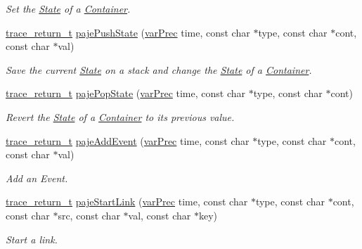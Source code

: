\begin{DoxyCompactItemize}
\begin{DoxyCompactList}\small\item\em Set the \hyperlink{structState}{State} of a \hyperlink{structContainer}{Container}. \end{DoxyCompactList}\item 
\hyperlink{group__type_ga1f1b68fb37d7331f03a48ef0993a0788}{trace\-\_\-return\-\_\-t} \hyperlink{group__cpaje_gaf92058cdf7d12c550866c98bf59338b8}{paje\-Push\-State} (\hyperlink{group__type_gabda13d5bcd0cbdb094d655181a857e25}{var\-Prec} time, const char $\ast$type, const char $\ast$cont, const char $\ast$val)
\begin{DoxyCompactList}\small\item\em Save the current \hyperlink{structState}{State} on a stack and change the \hyperlink{structState}{State} of a \hyperlink{structContainer}{Container}. \end{DoxyCompactList}\item 
\hyperlink{group__type_ga1f1b68fb37d7331f03a48ef0993a0788}{trace\-\_\-return\-\_\-t} \hyperlink{group__cpaje_ga67bd495e65937ecdc1bfe450cb0f0018}{paje\-Pop\-State} (\hyperlink{group__type_gabda13d5bcd0cbdb094d655181a857e25}{var\-Prec} time, const char $\ast$type, const char $\ast$cont)
\begin{DoxyCompactList}\small\item\em Revert the \hyperlink{structState}{State} of a \hyperlink{structContainer}{Container} to its previous value. \end{DoxyCompactList}\item 
\hyperlink{group__type_ga1f1b68fb37d7331f03a48ef0993a0788}{trace\-\_\-return\-\_\-t} \hyperlink{group__cpaje_ga303effbd4344a2f42872d4e70471250f}{paje\-Add\-Event} (\hyperlink{group__type_gabda13d5bcd0cbdb094d655181a857e25}{var\-Prec} time, const char $\ast$type, const char $\ast$cont, const char $\ast$val)
\begin{DoxyCompactList}\small\item\em Add an Event. \end{DoxyCompactList}\item 
\hyperlink{group__type_ga1f1b68fb37d7331f03a48ef0993a0788}{trace\-\_\-return\-\_\-t} \hyperlink{group__cpaje_ga6fa623c49bf3a2e9ebe7b138cc66e9a1}{paje\-Start\-Link} (\hyperlink{group__type_gabda13d5bcd0cbdb094d655181a857e25}{var\-Prec} time, const char $\ast$type, const char $\ast$cont, const char $\ast$src, const char $\ast$val, const char $\ast$key)
\begin{DoxyCompactList}\small\item\em Start a link. \end{DoxyCompactList}\item 

\end{DoxyCompactItemize}
